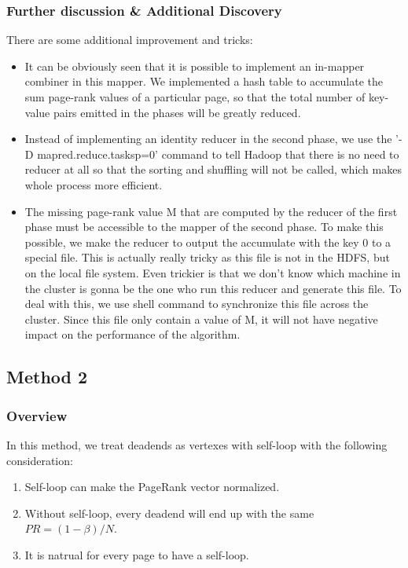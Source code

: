 \documentclass[a4paper]{article}
\begin{document}
\subsubsection{Further discussion \& Additional Discovery}
There are some additional improvement and tricks:
\begin{itemize}
	\item It can be obviously seen that it is possible to implement an in-mapper combiner in this mapper. We implemented a hash table to accumulate the sum page-rank values of a particular page, so that the total number of key-value pairs emitted in the phases will be greatly reduced.
	\item Instead of implementing an identity reducer in the second phase, we use the '-D mapred.reduce.tasksp=0' command to tell Hadoop that there is no need to reducer at all so that the sorting and shuffling will not be called, which makes whole process more efficient. 
	\item The missing page-rank value M that are computed by the reducer of the first phase must be accessible to the mapper of the second phase. To make this possible, we make the reducer to output the accumulate with the key 0 to a special file. This is actually really tricky as this file is not in the HDFS, but on the local file system. Even trickier is that we don't know which machine in the cluster is gonna be the one who run this reducer and generate this file. To deal with this, we use shell command to synchronize this file across the cluster. Since this file only contain a value of M, it will not have negative impact on the performance of the algorithm.
\end{itemize}


\subsection{Method 2}
\subsubsection{Overview}
In this method, we treat deadends as vertexes with self-loop with the following consideration:
\begin{enumerate}
	\item Self-loop can make the PageRank vector normalized.
	\item Without self-loop, every deadend will end up with the same $PR = (1 - \beta) / N$.
	\item It is natrual for every page to have a self-loop.
\end{enumerate}
\end{document}
